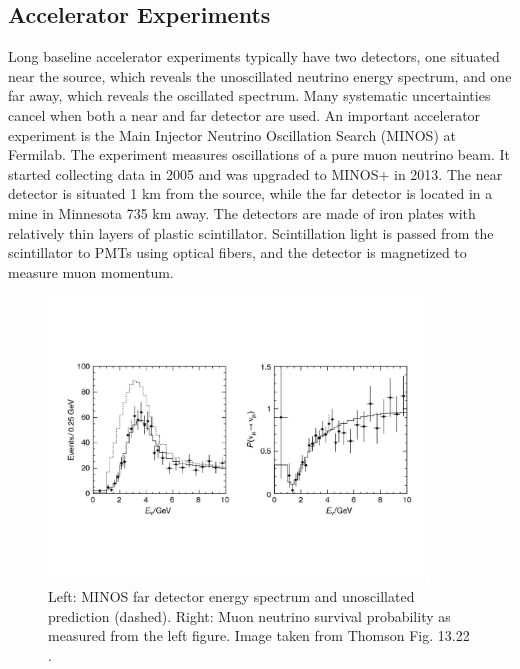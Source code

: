 \subsection{Accelerator Experiments}
Long baseline accelerator experiments typically have two detectors, one
situated near the source, which reveals the unoscillated neutrino energy
spectrum, and one far away, which reveals the oscillated spectrum.
Many systematic uncertainties cancel when both a near and far detector are
used.
An important accelerator experiment is the Main Injector Neutrino Oscillation
Search (MINOS) at Fermilab. The experiment measures oscillations
of a pure muon neutrino beam. It started collecting data in 2005 and
was upgraded to MINOS+ in 2013. The near detector is situated 1 km
from the source, while the far detector is located in a mine in Minnesota
735 km away. The detectors are made of iron plates with relatively
thin layers of
plastic scintillator. Scintillation light is passed from the scintillator to
PMTs using optical fibers, and the detector is magnetized to measure
muon momentum.

\begin{figure}
  \centering
  \includegraphics[width=0.90\textwidth,height=0.90\textheight,keepaspectratio]
                {pictures/t13_22.pdf}
  \vspace*{-20mm}
  \caption{Left: MINOS far detector energy spectrum and unoscillated
           prediction (dashed). Right: Muon neutrino survival probability
           as measured from the left figure. Image taken from Thomson
           Fig. 13.22 \cite{thomson_modern_2013}.}
  \label{fig:minos}
\end{figure}

